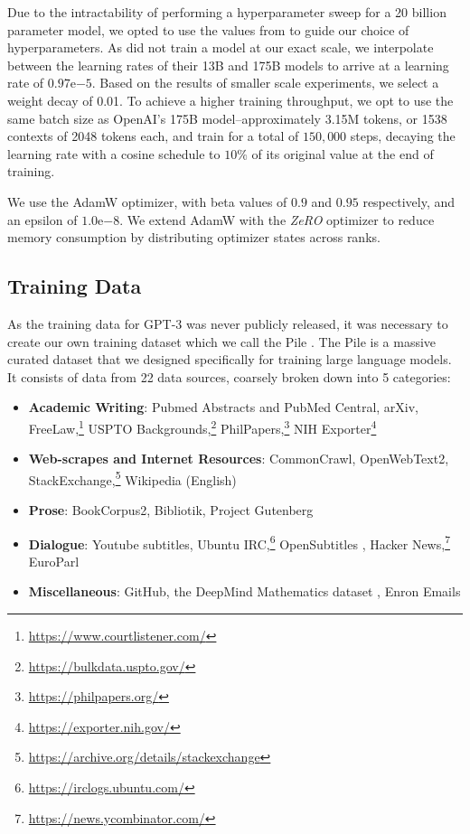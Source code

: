 \documentclass{article}
\begin{document}
Due to the intractability of performing a hyperparameter sweep for a 20 billion parameter model, we opted to use the values from \citet{brown2020language} to guide our choice of hyperparameters. As \citet{brown2020language} did not train a model at our exact scale, we interpolate between the learning rates of their 13B and 175B models to arrive at a learning rate of $0.97\mathrm{e}{-5}$. Based on the results of smaller scale experiments, we select a weight decay of 0.01. To achieve a higher training throughput, we opt to use the same batch size as OpenAI's 175B model--approximately 3.15M tokens, or 1538 contexts of 2048 tokens each, and train for a total of $150,000$ steps, decaying the learning rate with a cosine schedule to $10\%$ of its original value at the end of training.

We use the AdamW \citep{adamw} optimizer, with beta values of $0.9$ and $0.95$ respectively, and an epsilon of $1.0\mathrm{e}{-8}$. We extend AdamW with the \textit{ZeRO} optimizer \citep{zero} to reduce memory consumption by distributing optimizer states across ranks.

\subsection{Training Data}
\label{sec:training-data}

As the training data for GPT-3 was never publicly released, it was necessary to create our own training dataset which we call the Pile \citep{gao2020pile}. The Pile is a massive curated dataset that we designed specifically for training large language models. It consists of data from 22 data sources, coarsely broken down into 5 categories:

\begin{itemize}
    \item \textbf{Academic Writing}: Pubmed Abstracts and PubMed Central, arXiv, FreeLaw,\footnote{\url{https://www.courtlistener.com/}} USPTO Backgrounds,\footnote{\url{https://bulkdata.uspto.gov/}} PhilPapers,\footnote{\url{https://philpapers.org/}} NIH Exporter\footnote{\url{https://exporter.nih.gov/}}
    \item \textbf{Web-scrapes and Internet Resources}: CommonCrawl, OpenWebText2, StackExchange,\footnote{\url{https://archive.org/details/stackexchange}} Wikipedia (English)
    \item \textbf{Prose}: BookCorpus2, Bibliotik, Project Gutenberg \citep[PG-19;][]{raecompressive2019}
    \item \textbf{Dialogue}: Youtube subtitles, Ubuntu IRC,\footnote{\url{https://irclogs.ubuntu.com/}} OpenSubtitles \citep{lison-tiedemann-2016-opensubtitles2016}, Hacker News,\footnote{\url{https://news.ycombinator.com/}} EuroParl \citep{koehn-2005-europarl}
    \item \textbf{Miscellaneous}: GitHub, the DeepMind Mathematics dataset \citep{DBLP:journals/corr/abs-1904-01557}, Enron Emails \citep{10.1007/978-3-540-30115-8_22}
\end{itemize}
\end{document}

